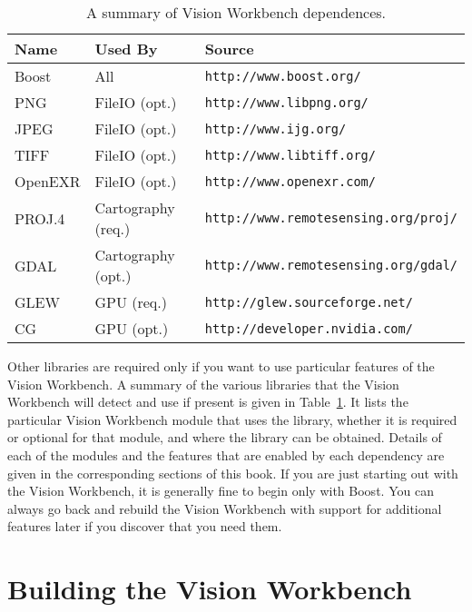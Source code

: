 \begin{table}[t]\begin{centering}
\begin{tabular}{|l|l|l|} \hline
Name    & Used By            & Source                                   \\ \hline \hline
Boost   & All                & \verb#http://www.boost.org/#              \\ \hline
PNG     & FileIO (opt.)      & \verb#http://www.libpng.org/#             \\ \hline
JPEG    & FileIO (opt.)      & \verb#http://www.ijg.org/#                \\ \hline
TIFF    & FileIO (opt.)      & \verb#http://www.libtiff.org/#            \\ \hline
OpenEXR & FileIO (opt.)      & \verb#http://www.openexr.com/#            \\ \hline
PROJ.4  & Cartography (req.) & \verb#http://www.remotesensing.org/proj/# \\ \hline
GDAL    & Cartography (opt.) & \verb#http://www.remotesensing.org/gdal/# \\ \hline
GLEW    & GPU (req.)         & \verb#http://glew.sourceforge.net/#       \\ \hline
CG      & GPU (opt.)         & \verb#http://developer.nvidia.com/#       \\ \hline
\end{tabular}
\caption{A summary of Vision Workbench dependences.}
\label{tbl:dependencies}
\end{centering}\end{table}

Other libraries are required only if you want to use particular
features of the Vision Workbench.  A summary of the various libraries
that the Vision Workbench will detect and use if present is given in
Table~\ref{tbl:dependencies}.  It lists the particular Vision
Workbench module that uses the library, whether it is required or
optional for that module, and where the library can be obtained.
Details of each of the modules and the features that are enabled by
each dependency are given in the corresponding sections of this book.
If you are just starting out with the Vision Workbench, it is
generally fine to begin only with Boost.  You can always go back and 
rebuild the Vision Workbench with support for additional features 
later if you discover that you need them.

\section{Building the Vision Workbench}

